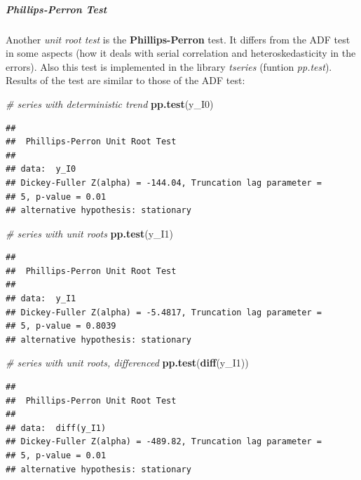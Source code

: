 \documentclass[
]{article}
\newenvironment{Shaded}{\begin{snugshade}}{\end{snugshade}}
\newcommand{\CommentTok}[1]{\textcolor[rgb]{0.56,0.35,0.01}{\textit{#1}}}
\newcommand{\KeywordTok}[1]{\textcolor[rgb]{0.13,0.29,0.53}{\textbf{#1}}}
\newcommand{\NormalTok}[1]{#1}
\begin{document}
\hypertarget{phillips-perron-test}{%
\subparagraph{Phillips-Perron Test}\label{phillips-perron-test}}

Another \emph{unit root test} is the \textbf{Phillips-Perron} test. It differs from the ADF test in some aspects (how it deals with serial correlation and heteroskedasticity in the errors). Also this test is implemented in the library \emph{tseries} (funtion \emph{pp.test}). Results of the test are similar to those of the ADF test:

\begin{Shaded}
\begin{Highlighting}[]
\CommentTok{# series with deterministic trend}
\KeywordTok{pp.test}\NormalTok{(y_I0)}
\end{Highlighting}
\end{Shaded}

\begin{verbatim}
## 
##  Phillips-Perron Unit Root Test
## 
## data:  y_I0
## Dickey-Fuller Z(alpha) = -144.04, Truncation lag parameter =
## 5, p-value = 0.01
## alternative hypothesis: stationary
\end{verbatim}

\begin{Shaded}
\begin{Highlighting}[]
\CommentTok{# series with unit roots}
\KeywordTok{pp.test}\NormalTok{(y_I1)}
\end{Highlighting}
\end{Shaded}

\begin{verbatim}
## 
##  Phillips-Perron Unit Root Test
## 
## data:  y_I1
## Dickey-Fuller Z(alpha) = -5.4817, Truncation lag parameter =
## 5, p-value = 0.8039
## alternative hypothesis: stationary
\end{verbatim}

\begin{Shaded}
\begin{Highlighting}[]
\CommentTok{# series with unit roots, differenced}
\KeywordTok{pp.test}\NormalTok{(}\KeywordTok{diff}\NormalTok{(y_I1))}
\end{Highlighting}
\end{Shaded}

\begin{verbatim}
## 
##  Phillips-Perron Unit Root Test
## 
## data:  diff(y_I1)
## Dickey-Fuller Z(alpha) = -489.82, Truncation lag parameter =
## 5, p-value = 0.01
## alternative hypothesis: stationary
\end{verbatim}
\end{document}
